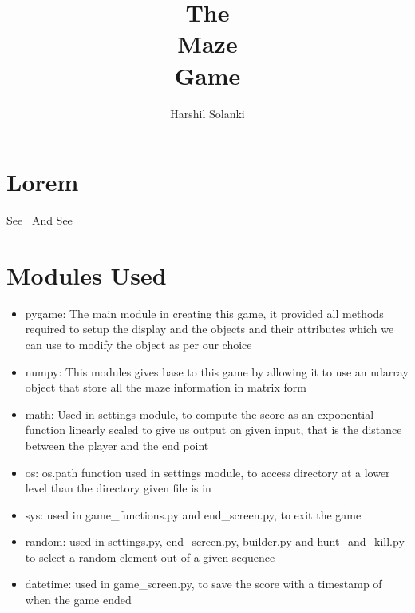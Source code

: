 \documentclass{article}
\begin{document}
\title{
The\\
Maze\\
Game\\
}
\author{Harshil Solanki}
\date{}
\maketitle
\tableofcontents
\clearpage


\section{Lorem}
See~\cite{thebook}
And See~\cite{menu-geeksforgeeks}

\section{Modules Used}
\begin{itemize}
    \item pygame: The main module in creating this game, it provided all methods required to setup the display and the objects and their attributes which we can use to modify the object as per our choice
    \item numpy: This modules gives base to this game by allowing it to use an ndarray object that store all the maze information in matrix form
    \item math: Used in settings module, to compute the score as an exponential function linearly scaled to give us output on given input, that is the distance between the player and the end point
    \item os: os.path function used in settings module, to access directory at a lower level than the directory given file is in
    \item sys: used in game\_functions.py and end\_screen.py, to exit the game
    \item random: used in settings.py, end\_screen.py, builder.py and hunt\_and\_kill.py to select a random element out of a given sequence 
    \item datetime: used in game\_screen.py, to save the score with a timestamp of when the game ended 
\end{itemize}
\end{document}
